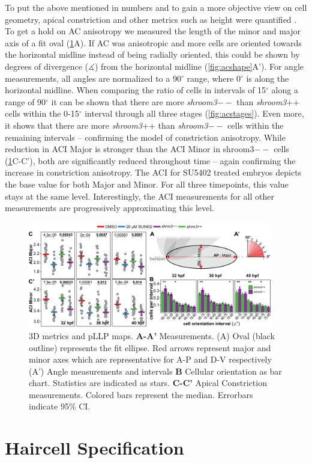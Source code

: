\documentclass[11pt,singlespacinge,twoside]{reedthesis} %
\begin{document}
To put the above mentioned in numbers and to gain a more objective view on cell geometry, apical constriction and other metrics such as height were quantified . To get a hold on AC anisotropy we measured the length of the minor and major axis of a fit oval (\ref{fig:acaci}A). If AC was anisotropic and more cells are oriented towards the horizontal midline instead of being radially oriented, this could be shown by degrees of divergence (\(\measuredangle\)) from the horizontal midline (\ref{fig:acshape}A').
For angle measurements, all angles are normalized to a 90\(^\circ\) range, where 0\(^\circ\) is along the horizontal midline. When comparing the ratio of cells in intervals of 15\(^\circ\) along a range of 90\(^\circ\) it can be shown that there are more \emph{shroom3}\(--\) than \emph{shroom3}++ cells within the 0-15\(^\circ\) interval through all three stages (\ref{fig:acstages}). Even more, it shows that there are more \emph{shroom3}++ than \emph{shroom3}\(--\) cells within the remaining intervals -- confirming the model of constriction anisotropy.
While reduction in ACI Major is stronger than the ACI Minor in shroom3\(--\) cells (\ref{fig:acaci}C-C'), both are significantly reduced throughout time -- again confirming the increase in constriction anisotropy. The ACI for SU5402 treated embryos depicts the base value for both Major and Minor. For all three timepoints, this value stays at the same level. Interestingly, the ACI measurements for all other measurements are progressively approximating this level.


\begin{figure}

{\centering \includegraphics[width=0.95\textwidth]{figures/results/04_constriction/Figure_5-2} 

}

\caption[3D metrics and pLLP maps]{3D metrics and pLLP maps. \textbf{A-A'} Measurements. (A) Oval (black outline) represents the fit ellipse. Red arrows represent major and minor axes which are representative for A-P and D-V respectively (A') Angle measurements and intervals \textbf{B} Cellular orientation as bar chart. Statistics are indicated as stars. \textbf{C-C'} Apical Constriction measurements. Colored bars represent the median. Errorbars indicate 95\% CI.}\label{fig:acaci}
\end{figure}
\hypertarget{res-hc}{%
\section{Haircell Specification}\label{res-hc}}
\end{document}
